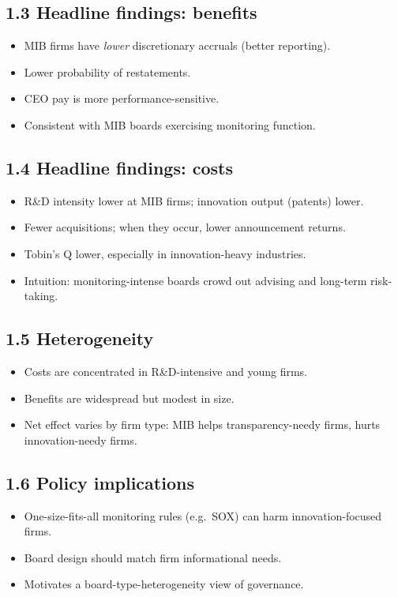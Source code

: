 \documentclass[11pt]{article}
\begin{document}
\subsection*{1.3 Headline findings: benefits}
\begin{itemize}
\item MIB firms have \emph{lower} discretionary accruals (better reporting).
\item Lower probability of restatements.
\item CEO pay is more performance-sensitive.
\item Consistent with MIB boards exercising monitoring function.
\end{itemize}

\subsection*{1.4 Headline findings: costs}
\begin{itemize}
\item R\&D intensity lower at MIB firms; innovation output (patents) lower.
\item Fewer acquisitions; when they occur, lower announcement returns.
\item Tobin's Q lower, especially in innovation-heavy industries.
\item Intuition: monitoring-intense boards crowd out advising and long-term risk-taking.
\end{itemize}

\subsection*{1.5 Heterogeneity}
\begin{itemize}
\item Costs are concentrated in R\&D-intensive and young firms.
\item Benefits are widespread but modest in size.
\item Net effect varies by firm type: MIB helps transparency-needy firms, hurts innovation-needy firms.
\end{itemize}

\subsection*{1.6 Policy implications}
\begin{itemize}
\item One-size-fits-all monitoring rules (e.g.\ SOX) can harm innovation-focused firms.
\item Board design should match firm informational needs.
\item Motivates a board-type-heterogeneity view of governance.
\end{itemize}
\end{document}
